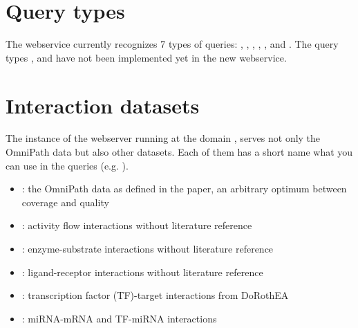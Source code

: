 \documentclass[letterpaper,10pt,english]{sphinxmanual}
\begin{document}
\section{Query types}
\label{\detokenize{index:query-types}}
The webservice currently recognizes 7 types of queries: ,
, , , ,  and
.
The query types ,  and  have not been
implemented yet in the new webservice.


\section{Interaction datasets}
\label{\detokenize{index:interaction-datasets}}
The instance of the  webserver running at the domain
, serves not only the OmniPath data but also other
datasets. Each of them has a short name what you can use in the queries
(e.g. ).
\begin{itemize}
\item {} 
: the OmniPath data as defined in the paper, an arbitrary
optimum between coverage and quality

\item {} 
: activity flow interactions without literature reference

\item {} 
: enzyme-substrate interactions without literature reference

\item {} 
: ligand-receptor interactions without literature reference

\item {} 
: transcription factor (TF)-target interactions from DoRothEA

\item {} 
: miRNA-mRNA and TF-miRNA interactions

\end{itemize}
\end{document}
